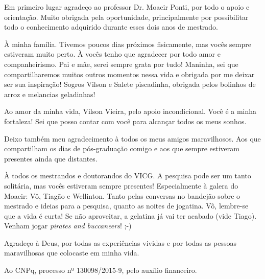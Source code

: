 
Em primeiro lugar agradeço ao professor Dr. Moacir Ponti, por todo o apoio e orientação. Muito obrigada pela oportunidade, principalmente por possibilitar todo o conhecimento adquirido durante esses dois anos de mestrado.

À minha família. Tivemos poucos dias próximos fisicamente, mas vocês sempre estiveram muito perto. À vocês tenho que agradecer por todo amor e companheirismo. Pai e mãe, serei sempre grata por tudo! Maninha, sei que compartilharemos muitos outros momentos nessa vida e obrigada por me deixar ser sua inspiração! Sogros Vilson e Salete piscadinha, obrigada pelos bolinhos de arroz e melancias geladinhas!

Ao amor da minha vida, Vilson Vieira, pelo apoio incondicional. Você é a minha fortaleza! Sei que posso contar com você para alcançar todos os meus sonhos.

Deixo também meu agradecimento à todos os meus amigos maravilhosos. Aos que compartilham os dias de pós-graduação comigo e aos que sempre estiveram presentes ainda que distantes.

À todos os mestrandos e doutorandos do VICG. A pesquisa pode ser um tanto solitária, mas vocês estiveram sempre presentes! Especialmente à galera do Moacir: Vô, Tiagão e Wellinton. Tanto pelas conversas no bandejão sobre o mestrado e ideias para a pesquisa, quanto as noites de jogatina. Vô, lembre-se que a vida é curta! Se não aproveitar, a gelatina já vai ter acabado (vide Tiago). Venham jogar \textit{pirates and buccaneers}! ;-)

Agradeço à Deus, por todas as experiências vividas e por todas as pessoas maravilhosas que colocaste em minha vida.

Ao CNPq, processo nº 130098/2015-9, pelo auxílio financeiro.
